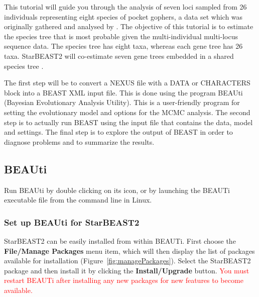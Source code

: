 \documentclass{article}
\begin{document}
This tutorial will guide you through the analysis of seven loci sampled from 26
individuals representing eight species of pocket gophers, a data set which was
originally gathered and analysed by
\cite{belfiore2008multilocus}. The objective of this tutorial is to estimate the
species tree that is most probable given the multi-individual multi-locus
sequence data. The species tree has eight taxa, whereas each gene tree has 26
taxa. StarBEAST2 will co-estimate seven gene trees embedded in a shared species
tree \citep{Heled01032010}.

The first step will be to convert a NEXUS file with a DATA or CHARACTERS block
into a BEAST XML input file. This is done using the program BEAUti (Bayesian
Evolutionary Analysis Utility). This is a user-friendly program for setting the
evolutionary model and options for the MCMC analysis. The second step is to
actually run BEAST using the input file that contains the data, model and
settings. The final step is to explore the output of BEAST in order to diagnose
problems and to summarize the results.

\subsection*{BEAUti}

Run BEAUti by double clicking on its icon, or by launching the BEAUTi executable
file from the command line in Linux.

\subsubsection*{Set up BEAUti for StarBEAST2}

StarBEAST2 can be easily installed from within BEAUTi. First choose the
\textbf{File/Manage Packages} menu item, which will then display the list of
packages available for installation (Figure~\ref{fig:managePackages}). Select
the StarBEAST2 package and then install it by clicking the
\textbf{Install/Upgrade} button. \textcolor{red}{You must restart BEAUTi after installing any new
packages for new features to become available.}
\end{document}

